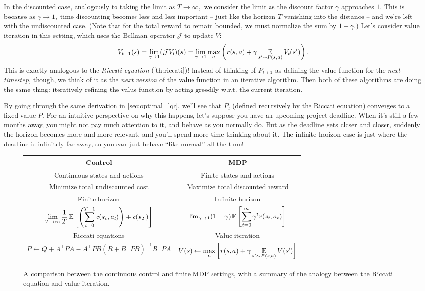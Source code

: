 \documentclass[../main/main]{subfiles}
\begin{document}
In the discounted case, analogously to taking the limit as $T \to \infty,$ we consider the limit as the discount factor $\gamma$ approaches $1.$ This is because as $\gamma \to 1,$ time discounting becomes less and less important -- just like the horizon $T$ vanishing into the distance -- and we're left with the undiscounted case. (Note that for the total reward to remain bounded, we must normalize the sum by $1 - \gamma.$) Let's consider value iteration in this setting, which uses the Bellman operator $\mathcal{J}$ to update $V$: \[
    V_{t+1}(s) = \lim_{\gamma \to 1} (\mathcal{J} V_t)(s) = \lim_{\gamma \to 1} \max_a \left( r(s, a) + \gamma \operatorname*{\mathbb{E}}_{s' \sim P(s, a)} V_t(s') \right).
\]
This is exactly analogous to the \emph{Riccati equation} (\ref{th:riccati})!
Instead of thinking of $P_{t+1}$ as defining the value function for the \emph{next timestep,} though, we think of it as the \emph{next version} of the value function in an iterative algorithm.
Then both of these algorithms are doing the same thing:
iteratively refining the value function by acting greedily w.r.t. the current iteration.

By going through the same derivation in \autoref{sec:optimal_lqr}, we'll see that $P_t$ (defined recursively by the Riccati equation) converges to a fixed value $P$.
For an intuitive perspective on why this happens, let's suppose you have an upcoming project deadline. When it's still a few months away, you might not pay
much attention to it, and behave as you normally do. But as the deadline gets closer and closer, suddenly the
horizon becomes more and more relevant, and you'll spend more time thinking about it.
The infinite-horizon case is just where the deadline is infinitely far away, so you can just behave ``like normal'' all the time!


\begin{figure}[h]
    \centering
    \renewcommand{\arraystretch}{1.5}
    \begin{tabular}{c|c}
        \textbf{Control} & \textbf{MDP} \\
        \hline
        Continuous states and actions & Finite states and actions \\
        Minimize total undiscounted cost & Maximize total discounted reward \\
        Finite-horizon & Infinite-horizon \\
        $\displaystyle \lim_{T \to \infty} \frac{1}{T} \operatorname*{\mathbb{E}} \left[ \left( \sum_{t=0}^{T-1} c(s_t, a_t) \right) + c(s_T) \right]$ & $\lim_{\gamma \to 1} \displaystyle (1 - \gamma) \operatorname*{\mathbb{E}} \left[ \sum_{t=0}^{\infty} \gamma^t r(s_t, a_t) \right]$ \\
        Riccati equations & Value iteration \\
        $\displaystyle P \gets Q + A^\top P A - A^\top P B (R + B^\top P B)^{-1} B^\top P A$ & $\displaystyle V(s) \gets \max_a \left[ r(s, a) + \gamma \operatorname*{\mathbb{E}}_{s' \sim P(s, a)} V(s') \right]$
    \end{tabular}
    \caption{A comparison between the continuous control and finite MDP settings, with a summary of the analogy between the Riccati equation and value iteration.}
    \label{fig:control_mdp}
\end{figure}
\end{document}
